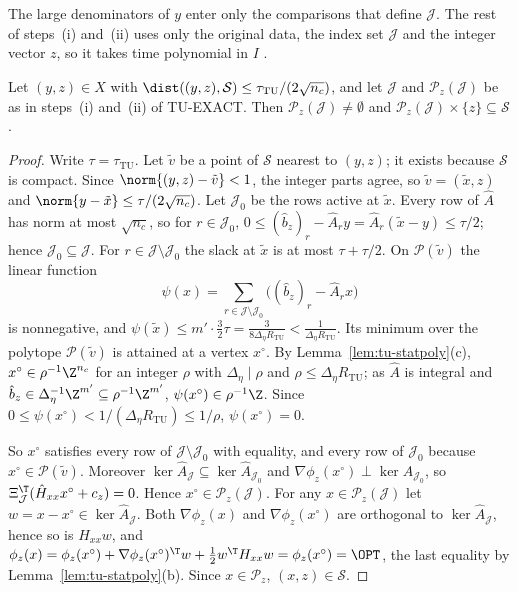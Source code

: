 The large denominators of $y$ enter only the comparisons that define
$\mathcal J$. The rest of steps~(i) and~(ii) uses only the original data,
the index set $\mathcal J$ and the integer vector $z$, so it takes time
polynomial in $I$ \cite[Theorem~6.4.12]{GrotschelLovaszSchrijver1988}.

\begin{lemma}\label{lem:tu-snap}
Let $(y,z)\in X$ with $\dist((y,z),\mathcal S)\le\tau_{\mathrm{TU}}/(2\sqrt{n_c})$,
and let $\mathcal J$ and $\mathcal P_z(\mathcal J)$ be as in steps~(i)
and~(ii) of TU-EXACT. Then $\mathcal P_z(\mathcal J)\ne\emptyset$ and
$\mathcal P_z(\mathcal J)\times\{z\}\subseteq\mathcal S$.
\end{lemma}

\begin{proof}
Write $\tau=\tau_{\mathrm{TU}}$. Let $\tilde v$ be a point of $\mathcal S$
nearest to $(y,z)$; it exists because $\mathcal S$ is compact. Since
$\norm{(y,z)-\tilde v}<1$, the integer parts agree, so $\tilde v=(\tilde x,z)$
and $\norm{y-\tilde x}\le\tau/(2\sqrt{n_c})$. Let $\mathcal J_0$ be the rows
active at $\tilde x$. Every row of $\hat A$ has norm at most $\sqrt{n_c}$, so
for $r\in\mathcal J_0$,
$0\le(\hat b_z)_r-\hat A_ry=\hat A_r(\tilde x-y)\le\tau/2$; hence
$\mathcal J_0\subseteq\mathcal J$. For $r\in\mathcal J\setminus\mathcal J_0$ the
slack at $\tilde x$ is at most $\tau+\tau/2$. On $\mathcal P(\tilde v)$ the
linear function
\[
\psi(x)=\sum_{r\in\mathcal J\setminus\mathcal J_0}\bigl((\hat b_z)_r-\hat A_rx\bigr)
\]
is nonnegative, and
$\psi(\tilde x)\le m'\cdot\frac32\tau=\frac3{8\Delta_\eta R_{\mathrm{TU}}}
<\frac1{\Delta_\eta R_{\mathrm{TU}}}$. Its minimum over the polytope
$\mathcal P(\tilde v)$ is attained at a vertex $x^\circ$. By
Lemma~\ref{lem:tu-statpoly}(c), $x^\circ\in\rho^{-1}\Z^{n_c}$ for an integer
$\rho$ with $\Delta_\eta\mid\rho$ and $\rho\le\Delta_\eta R_{\mathrm{TU}}$; as
$\hat A$ is integral and
$\hat b_z\in\Delta_\eta^{-1}\Z^{m'}\subseteq\rho^{-1}\Z^{m'}$,
$\psi(x^\circ)\in\rho^{-1}\Z$. Since
$0\le\psi(x^\circ)<1/(\Delta_\eta R_{\mathrm{TU}})\le1/\rho$,
$\psi(x^\circ)=0$.

So $x^\circ$ satisfies every row of $\mathcal J\setminus\mathcal J_0$ with
equality, and every row of $\mathcal J_0$ because $x^\circ\in\mathcal P(\tilde v)$.
Moreover $\ker\hat A_{\mathcal J}\subseteq\ker\hat A_{\mathcal J_0}$ and
$\nabla\phi_z(x^\circ)\perp\ker\hat A_{\mathcal J_0}$, so
$\Xi_{\mathcal J}^{\T}(\hat H_{xx}x^\circ+c_z)=0$. Hence
$x^\circ\in\mathcal P_z(\mathcal J)$. For any $x\in\mathcal P_z(\mathcal J)$ let
$w=x-x^\circ\in\ker\hat A_{\mathcal J}$. Both $\nabla\phi_z(x)$ and
$\nabla\phi_z(x^\circ)$ are orthogonal to $\ker\hat A_{\mathcal J}$, hence so is
$H_{xx}w$, and
$\phi_z(x)=\phi_z(x^\circ)+\nabla\phi_z(x^\circ)^{\T}w+\frac12w^{\T}H_{xx}w=\phi_z(x^\circ)=\OPT$,
the last equality by Lemma~\ref{lem:tu-statpoly}(b). Since
$x\in\mathcal P_z$, $(x,z)\in\mathcal S$.
\end{proof}

